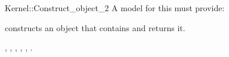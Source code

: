 \begin{ccRefFunctionObjectConcept}{Kernel::Construct_object_2}
A model for this must provide:


{constructs an object that contains  and returns it.}

\ccSeeAlso
{},
,
,
,
,
.

\end{ccRefFunctionObjectConcept}
